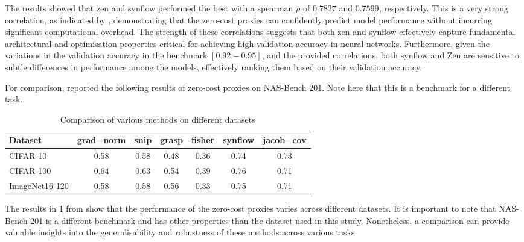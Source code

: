 The results showed that zen and synflow performed the best with a spearman $\rho$ of $0.7827$ and $0.7599$, respectively. This is a very strong correlation, as indicated by \cite{spear}, demonstrating that the zero-cost proxies can confidently predict model performance without incurring significant computational overhead. The strength of these correlations suggests that both zen and synflow effectively capture fundamental architectural and optimisation properties critical for achieving high validation accuracy in neural networks. Furthermore, given the variations in the validation accuracy in the benchmark $[0.92 - 0.95]$, and the provided correlations, both synflow and Zen are sensitive to subtle differences in performance among the models, effectively ranking them based on their validation accuracy. 

For comparison, \cite{abdelfattah2021zero} reported the following results of zero-cost proxies on NAS-Bench 201. Note here that this is a benchmark for a different task. 

\begin{table}[h]
\caption{Comparison of various methods on different datasets}
\centering
\begin{adjustbox}{center}
\begin{tabular}{l|cccccc}
\textbf{Dataset} & \textbf{grad\_norm} & \textbf{snip} & \textbf{grasp} & \textbf{fisher} & \textbf{synflow} & \textbf{jacob\_cov} \\ \hline
\multicolumn{1}{l|}{CIFAR-10} & 0.58 & 0.58 & 0.48 & 0.36 & 0.74 & 0.73 \\
\multicolumn{1}{l|}{\cellcolor{verylightgray}CIFAR-100} & \cellcolor{verylightgray}0.64 & \cellcolor{verylightgray}0.63 & \cellcolor{verylightgray}0.54 & \cellcolor{verylightgray}0.39 & \cellcolor{verylightgray}0.76 & \cellcolor{verylightgray}0.71 \\
\multicolumn{1}{l|}{ImageNet16-120} & 0.58 & 0.58 & 0.56 & 0.33 & 0.75 & 0.71 \\
\end{tabular}
\end{adjustbox}
\label{tab:comparison}
\end{table}

The results in \cref{tab:comparison} from \cite{abdelfattah2021zero} show that the performance of the zero-cost proxies varies across different datasets. It is important to note that NAS-Bench 201 is a different benchmark and has other properties than the dataset used in this study. Nonetheless, a comparison can provide valuable insights into the generalisability and robustness of these methods across various tasks.

